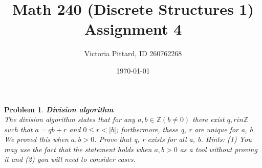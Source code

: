 \documentclass{article}
\newtheorem{problem}{Problem}
\theoremstyle{definition}
\begin{document}
\title{Math 240 (Discrete Structures 1) Assignment 4}
\author{Victoria Pittard, ID 260762268}
\date{\today}

\maketitle

\begin{problem}
\textbf{Division algorithm}\\
The division algorithm states that for any $a, b \in \mathbb{Z} (b\neq 0)$ there exist $q, r in \mathbb{Z}$ such that $a=qb+r$ and $0\leq r < |b|$; furthermore, these q, r are unique for a, b. We proved this when $a,b>0$. Prove that q, r exists for all a, b. Hints: (1) You may use the fact that the statement holds when $a,b>0$ as a tool without proving it and (2) you will need to consider cases.
\end{problem}
\end{document}
